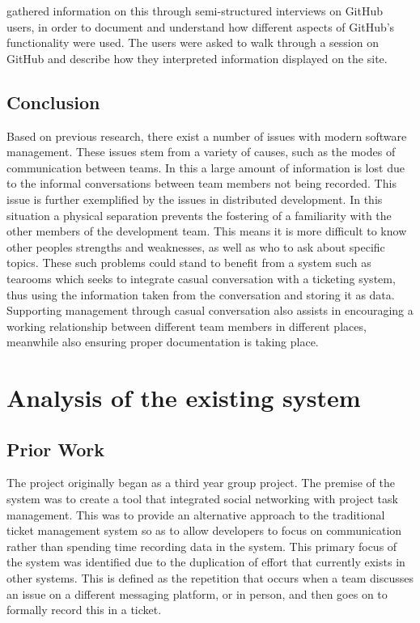 \documentclass{l4proj}
\begin{document}
\citet{dabbish12social} gathered information on this through semi-structured interviews on GitHub users, in order to document and understand how different aspects of GitHub's functionality were used.  The users were asked to walk through a session on GitHub and describe how they interpreted information displayed on the site.


\section{Conclusion}

Based on previous research, there exist a number of issues with modern software management.  These issues stem from a variety of causes, such as the modes of communication between teams.  In this a large amount of information is lost due to the informal conversations between team members not being recorded.  This issue is further exemplified by the issues in distributed development.  In this situation a physical separation prevents the fostering of a familiarity with the other members of the development team.  This means it is more difficult to know other peoples strengths and weaknesses, as well as who to ask about specific topics. These such problems could stand to benefit from a system such as tearooms which seeks to integrate casual conversation with a ticketing system, thus using the information taken from the conversation and storing it as data.  Supporting management through casual conversation also assists in encouraging a working relationship between different team members in different places, meanwhile also ensuring proper documentation is taking place.

\chapter{Analysis of the existing system}

\section{Prior Work}

The project originally began as a third year group project.  The premise of the system was to create a tool that integrated social networking with project task management.  This was to provide an alternative approach to the traditional ticket management system so as to allow developers to focus on communication rather than spending time recording data in the system.  This primary focus of the system was identified due to the duplication of effort that currently exists in other systems.  This is defined as the repetition that occurs when a team discusses an issue on a different messaging platform, or in person, and then goes on to formally record this in a ticket.
\end{document}
